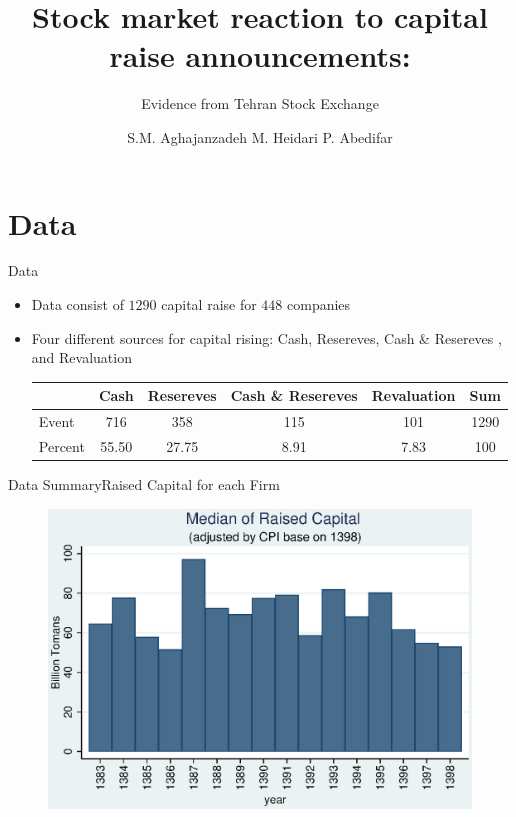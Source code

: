 \documentclass{beamer}
\title[Capital Raise]{Stock market reaction to capital raise announcements:}
\subtitle{Evidence from Tehran Stock Exchange}
\author[Aghajanzadeh, Heidari \&Abedifar]{S.M. Aghajanzadeh \qquad M. Heidari \qquad P. Abedifar }
\institute[]{Tehran Institute for Advanced Studies }
\begin{document}
{\maketitle}

\section{Data}
\begin{frame}{Data}
\begin{itemize}
\item Data consist of $1290$ capital raise for $448$ companies 

\item Four different sources for capital rising: Cash, Resereves, Cash \& Resereves , and Revaluation \\

\begin{table}[htbp]
  \centering
\label{t1}
\resizebox{0.7\textwidth}{!}
{
    \begin{tabular}{lccccc}
    \hline
    \hline
          & \multicolumn{1}{l}{Cash} & \multicolumn{1}{c}{Resereves} & \multicolumn{1}{c}{Cash \& Resereves} & \multicolumn{1}{c}{Revaluation} &  \multicolumn{1}{c}{Sum} \\
          \hline
    Event & 716   & 358   & 115   & 101   & 1290 \\
Percent & 55.50 & 27.75 & 8.91  & 7.83  & 100 \\
    \hline\hline
    \end{tabular}
    }
  \label{tab:addlabel}
  
\end{table}%


\end{itemize}

\end{frame}






\begin{frame}{Data Summary}{Raised Capital for each Firm}
\begin{figure}
\centering
\includegraphics[width=0.7\linewidth]{Output/MedianCapRaiseAdjusted.eps}
\label{fig:mediancapraise}
\end{figure}
\end{frame}
\end{document}
